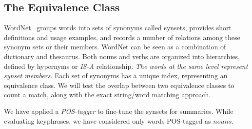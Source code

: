 \documentclass[a4paper]{report}
\begin{document}
\subsection*{The Equivalence Class}
WordNet~\cite{Miller1990} groups words into sets of synonyms called synsets, provides short definitions and usage examples, and records a number of relations among these synonym sets or their members. WordNet can be seen as a combination of dictionary and thesaurus. Both nouns and verbs are organized into hierarchies, defined by hypernyms or \emph{IS-A} relationship. \emph{The words at the same level represent synset members}. Each set of synonyms has a unique index, representing an equivalence class.   We will test the overlap between two equivalence classes to count a match, along with the exact string/word matching approach.  
\begin{table}[h]
\centering
{}
\caption{Synset-based Similarity Measure}
\label{keTable}
\end{table}

\par We have applied a \emph{POS-tagger} to fine-tune the synsets for summaries. While evaluating keyphrases, we have considered only words POS-tagged as $nouns$.
\end{document}

